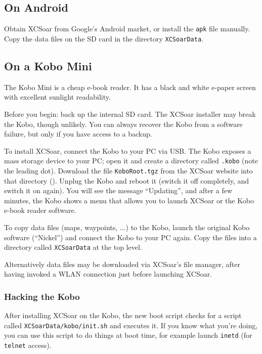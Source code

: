 \subsection*{On Android}

Obtain XCSoar from Google's Android market, or install the \verb|apk|
file manually.  Copy the data files on the SD card in the directory
\verb|XCSoarData|.

\subsection*{On a Kobo Mini}

The Kobo Mini is a cheap e-book reader.  It has a black and white
e-paper screen with excellent sunlight readability.

Before you begin: back up the internal SD card.  The XCSoar installer
may break the Kobo, though unlikely.  You can always recover the Kobo
from a software failure, but only if you have access to a backup.

To install XCSoar, connect the Kobo to your PC via USB.  The Kobo
exposes a mass storage device to your PC; open it and create a
directory called \texttt{.kobo} (note the leading dot).  Download the
file \texttt{KoboRoot.tgz} from the XCSoar website into that
directory (). Unplug the Kobo and reboot it (switch it off completely,
and switch it on again).  You will see the message ``Updating'', and
after a few minutes, the Kobo shows a menu that allows you to launch
XCSoar or the Kobo \mbox{e-book} reader software.

To copy data files (maps, waypoints, ...) to the Kobo, launch the
original Kobo software (``Nickel'') and connect the Kobo to your PC
again.  Copy the files into a directory called \texttt{XCSoarData} at
the top level.

Alternatively data files may be downloaded via XCSoar's file manager,
after having invoked a WLAN connection just before launching XCSoar.

\subsubsection{Hacking the Kobo}

After installing XCSoar on the Kobo, the new boot script checks for a
script called \texttt{XCSoarData/kobo/init.sh} and executes it.  If
you know what you're doing, you can use this script to do things at
boot time, for example launch \texttt{inetd} (for \texttt{telnet}
access).

